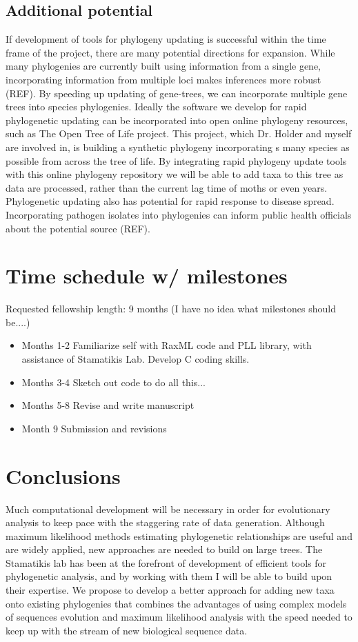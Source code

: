 \documentclass[10pt]{article}
\begin{document}
\subsection*{Additional potential}
If development of tools for phylogeny updating is successful within the time frame of the project, there are many potential directions for expansion. While many phylogenies are currently built using information from a single gene, incorporating information from multiple loci makes inferences more robust (REF). By speeding up updating of gene-trees, we can incorporate multiple gene trees into species phylogenies.
Ideally the software we develop for rapid phylogenetic updating can be incorporated into open online phylogeny resources, such as The Open Tree of Life project. This project, which Dr. Holder and myself are involved in, is building a synthetic phylogeny incorporating s many species as possible from across the tree of life. By integrating rapid phylogeny update tools with this online phylogeny repository we will be able to add taxa to this tree as data are processed, rather than the current lag time of moths or even years. Phylogenetic updating also has potential for rapid response to disease spread. Incorporating pathogen isolates into phylogenies can inform public health officials about the potential source (REF).

         
\section*{Time schedule w/ milestones}
   Requested fellowship length: 9 months
   (I have no idea what milestones should be....)
 
\begin{itemize}
  \item{Months 1-2} Familiarize self with RaxML code and PLL library, with assistance of Stamatikis Lab. Develop C coding skills.
  \item{Months 3-4} Sketch out code to do all this... 
  \item{Months 5-8} Revise and write manuscript
  \item{Month 9} Submission and revisions
\end{itemize}


\section*{Conclusions}
Much computational development will be necessary in order for evolutionary analysis to keep pace with the staggering rate of data generation. Although maximum likelihood methods estimating phylogenetic relationships are useful and are widely applied, new approaches are needed to build on large trees. The Stamatikis lab has been at the forefront of development of efficient tools for phylogenetic analysis, and by working with them I will be able to build upon their expertise. We propose to develop a better approach for adding new taxa onto existing phylogenies that combines the advantages of using complex models of sequences evolution and maximum likelihood analysis with the speed needed to keep up with the stream of new biological sequence data. 
\end{document}
